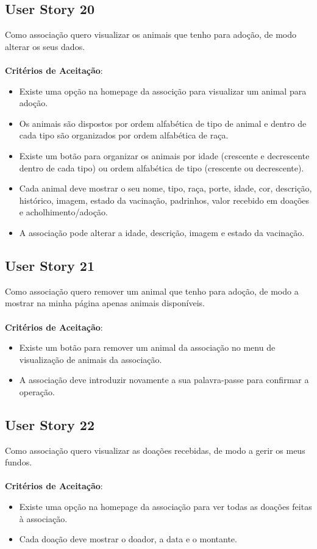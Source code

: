 \documentclass[a4paper,11pt]{article}
\begin{document}
\subsection{User Story 20}
Como associação quero visualizar os animais que tenho para adoção, de modo alterar os seus dados.\\\\
\textbf{Critérios de Aceitação}:
\begin{itemize}
  \item Existe uma opção na homepage da associção para visualizar um animal para adoção.
  \item Os animais são dispostos por ordem alfabética de tipo de animal e dentro de cada tipo são organizados por ordem alfabética de raça.
  \item Existe um botão para organizar os animais por idade (crescente e decrescente dentro de cada tipo) ou ordem alfabética de tipo (crescente ou decrescente).
  \item Cada animal deve mostrar o seu nome, tipo, raça, porte, idade, cor, descrição, histórico, imagem, estado da vacinação, padrinhos, valor recebido em doações e acholhimento/adoção.
  \item A associação pode alterar a idade, descrição, imagem e estado da vacinação.
\end{itemize}

\subsection{User Story 21}
Como associação quero remover um animal que tenho para adoção, de modo a mostrar na minha página apenas animais disponíveis.\\\\
\textbf{Critérios de Aceitação}:
\begin{itemize}
  \item Existe um botão para remover um animal da associação no menu de visualização de animais da associação.
  \item A associação deve introduzir novamente a sua palavra-passe para confirmar a operação.
\end{itemize}

\subsection{User Story 22}
Como associação quero visualizar as doações recebidas, de modo a gerir os meus fundos.\\\\
\textbf{Critérios de Aceitação}:
\begin{itemize}
  \item Existe uma opção na homepage da associação para ver todas as doações feitas à associação.
  \item Cada doação deve mostrar o doador, a data e o montante.
\end{itemize}
\end{document}
